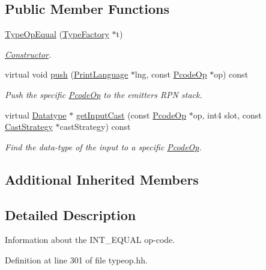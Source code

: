 \subsection*{Public Member Functions}
\begin{DoxyCompactItemize}
\item 
\mbox{\hyperlink{class_type_op_equal_a545a936d941f71f73abbc9adadaa8f0b}{Type\+Op\+Equal}} (\mbox{\hyperlink{class_type_factory}{Type\+Factory}} $\ast$t)
\begin{DoxyCompactList}\small\item\em \mbox{\hyperlink{class_constructor}{Constructor}}. \end{DoxyCompactList}\item 
virtual void \mbox{\hyperlink{class_type_op_equal_a77801a9716663c07bca5f040e793275f}{push}} (\mbox{\hyperlink{class_print_language}{Print\+Language}} $\ast$lng, const \mbox{\hyperlink{class_pcode_op}{Pcode\+Op}} $\ast$op) const
\begin{DoxyCompactList}\small\item\em Push the specific \mbox{\hyperlink{class_pcode_op}{Pcode\+Op}} to the emitter\textquotesingle{}s R\+PN stack. \end{DoxyCompactList}\item 
virtual \mbox{\hyperlink{class_datatype}{Datatype}} $\ast$ \mbox{\hyperlink{class_type_op_equal_a26875505fcaa2316cc32a9cb7b0f18cf}{get\+Input\+Cast}} (const \mbox{\hyperlink{class_pcode_op}{Pcode\+Op}} $\ast$op, int4 slot, const \mbox{\hyperlink{class_cast_strategy}{Cast\+Strategy}} $\ast$cast\+Strategy) const
\begin{DoxyCompactList}\small\item\em Find the data-\/type of the input to a specific \mbox{\hyperlink{class_pcode_op}{Pcode\+Op}}. \end{DoxyCompactList}\end{DoxyCompactItemize}
\subsection*{Additional Inherited Members}


\subsection{Detailed Description}
Information about the I\+N\+T\+\_\+\+E\+Q\+U\+AL op-\/code. 

Definition at line 301 of file typeop.\+hh.




